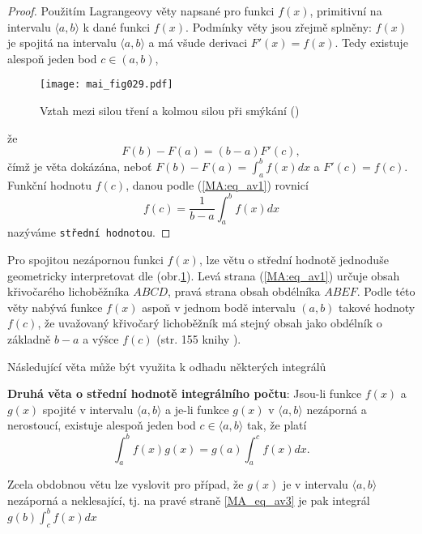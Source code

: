   \begin{proof} Použitím Lagrangeovy věty napsané pro funkci \(f(x)\), primitivní na intervalu
    $\langle a, b\rangle$ k dané funkci \(f(x)\). Podmínky věty jsou zřejmě splněny: \(f(x)\) je
    spojitá na intervalu $\langle a, b\rangle$ a má všude derivaci $F'(x)= f(x)$. Tedy existuje
    alespoň jeden bod $c\in(a, b)$,
    
    \begin{figure}[ht!]  %
      \centering
      \texttt{[image: mai\_fig029.pdf]}
      \caption{Vztah mezi silou tření a kolmou silou při smýkání
              (\cite[s.~173]{Feynman01})}
      \label{mai:fig029}
    \end{figure}

     že $$F(b)-F(a) = (b-a)F'(c),$$ čímž je věta dokázána, neboť $F(b)-F(a) = \int_a^bf(x)dx$ a
     $F'(c) = f(c)$. Funkční hodnotu $f(c)$, danou podle (\ref{MA:eq_av1}) rovnicí  
     \begin{equation}\label{MA:eq_av2}
        f(c) = \frac{1}{b-a}\int_a^b f(x)dx
     \end{equation}
     nazýváme \texttt{střední hodnotou}.
  \end{proof}

  Pro spojitou nezápornou funkci \(f(x)\), lze větu o střední hodnotě jednoduše geometricky
  interpretovat dle (obr.\ref{mai:fig029}). Levá strana (\ref{MA:eq_av1}) určuje obsah
  křivočarého lichoběžníka $ABCD$, pravá strana obsah obdélníka $ABEF$. Podle této věty nabývá
  funkce \(f(x)\) aspoň v jednom bodě intervalu $(a, b)$ takové hodnoty $f(c)$, že uvažovaný
  křivočarý lichoběžník má stejný obsah jako obdélník o základně $b-a$ a výšce $f(c)$ (str. 155
  knihy \cite{Knichal}).

  

  

  Následující věta může být využita k odhadu některých integrálů
  \begin{lemma}
    \textbf{Druhá věta o střední hodnotě integrálního počtu}: Jsou-li funkce \(f(x)\) a $g(x)$
    spojité v intervalu $\langle a, b \rangle$ a je-li funkce $g(x)$ v $\langle a, b \rangle$
    nezáporná a nerostoucí, existuje alespoň jeden bod $c\in\langle a, b \rangle$ tak, že platí
    \begin{equation}\label{MA_eq_av3}
        \int_a^b f(x)g(x) = g(a)\int_a^c f(x)dx.
    \end{equation}
  \end{lemma}
  Zcela obdobnou větu lze vyslovit pro případ, že $g(x)$ je v intervalu $\langle a, b \rangle$
  nezáporná a neklesající, tj. na pravé straně \ref{MA_eq_av3} je pak integrál $g(b)\int_c^b
  f(x)dx$

